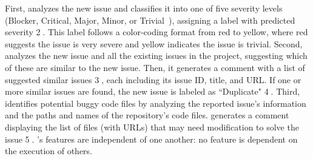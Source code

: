 First, \toolname analyzes the new issue and classifies it into one of five severity levels (Blocker, Critical, Major, Minor, or Trivial~\cite{severityTypes}), assigning a label with predicted severity \textcircled{2}. This label follows a color-coding format from red to yellow, where red suggests the issue is very severe and yellow indicates the issue is trivial. 
Second, \toolname analyzes the new issue and all the existing issues in the project, suggesting which of these are similar to the new issue. Then, it generates a comment with a list of suggested similar issues \textcircled{3}, each including its issue ID, title, and URL. If one or more similar issues are found, the new issue is labeled as ``Duplicate" \textcircled{4}.  Third, \toolname identifies potential buggy code files by analyzing the reported issue's information and the paths and names of the repository's code files.
\toolname generates a comment displaying the list of files (with URLs) that may need modification to solve the issue \textcircled{5}.
\toolname's features are independent of one another: no feature is dependent on the execution of others.

